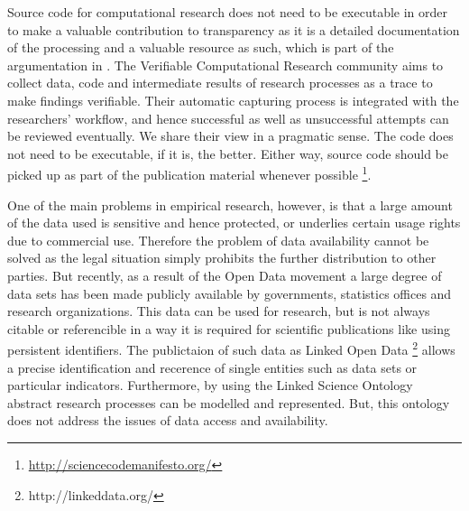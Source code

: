 \documentclass{sig-alternate}
\begin{document}
Source code for computational research does not need to be executable in order to make a valuable contribution to transparency
as it is a detailed documentation of the processing and a valuable resource as such, which is part of the argumentation in 
%
%
\cite{gavish2011universal}.
The Verifiable Computational Research community aims to collect data, code and intermediate results of research processes as a trace to make findings verifiable.
Their automatic capturing process is integrated with the researchers' workflow, and hence successful as well as unsuccessful attempts can be reviewed eventually. 
We share their view in a pragmatic sense. The code does not need to be executable, if it is, the better. %
Either way, source code should be picked up as part of the publication material whenever possible
%
%
%
\cite{barnes2012science}\footnote{\url{http://sciencecodemanifesto.org/}}.




One of the main problems in empirical research, however, is that a large amount of the data used is sensitive and hence protected, or underlies certain usage rights due to commercial use. %
Therefore the problem of data availability cannot be solved as the legal situation simply prohibits the further distribution to other parties.
But recently, as a result of the Open Data movement a large degree of data sets has been made publicly available by governments, statistics offices and research organizations. This data can be used for research, but is not always citable or referencible in a way it is required for scientific publications like using persistent identifiers. The publictaion of such data as Linked Open Data \footnote{http://linkeddata.org/} allows a precise identification and recerence of single entities such as data sets or particular indicators. Furthermore, by using the Linked Science Ontology \cite{kauppinen_et_al_linked_science_2011} abstract research processes can be modelled and represented. But, this ontology does not address the issues of data access and availability.
\end{document}
